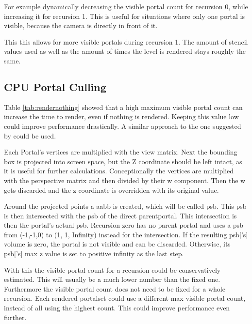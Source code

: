 For example dynamically decreasing the visible portal count for recursion 0, while increasing it for recursion 1. This is useful for situations where only one portal is visible, because the camera is directly in front of it.

This this allows for more visible portals during recursion 1. The amount of stencil values used as well as the amount of times the level is rendered stays roughly the same.

\subsection{CPU Portal Culling}
\label{section:cullingportals}
Table \ref{tab:rendernothing} showed that a high maximum visible portal count can increase the time to render, even if nothing is rendered. Keeping this value low could improve performance drastically. A similar approach to the one suggested by \cite{luebke:1995:portals} could be used.

Each Portal's vertices are multiplied with the view matrix. Next the bounding box is projected into screen space, but the Z coordinate should be left intact, as it is useful for further calculations. Conceptionally the vertices are multiplied with the perspective matrix and then divided by their w component. Then the w gets discarded and the z coordinate is overridden with its original value.

Around the projected points a \gls{aabb} is created, which will be called \gls{psb}. This \gls{psb} is then intersected with the \gls{psb} of the direct \gls{parentportal}. This intersection is then the portal's actual \gls{psb}. Recursion zero has no parent portal and uses a \gls{psb} from (-1,-1,0) to (1, 1, Infinity) instead for the intersection. If the resulting \gls{psb}['s] volume is zero, the portal is not visible and can be discarded. Otherwise, its \gls{psb}['s] max z value is set to positive infinity as the last step.




With this the visible portal count for a recursion could be conservatively estimated. This will usually be a much lower number than the fixed one. Furthermore the visible portal count does not need to be fixed for a whole recursion. Each rendered \gls{portalset} could use a different max visible portal count, instead of all using the highest count. This could improve performance even further.

